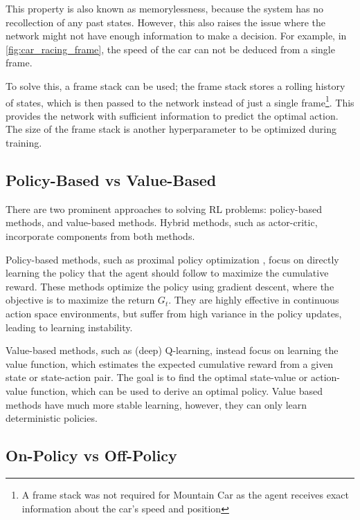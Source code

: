 This property is also known as memorylessness, because the system has no
recollection of any past states. However, this also raises the issue where the
network might not have enough information to make a decision. For example, in
\autoref{fig:car_racing_frame}, the speed of the car can not be deduced from a
single frame.



To solve this, a frame stack can be used; the frame stack stores a rolling
history of states, which is then passed to the network instead of just a single
frame\footnote{A frame stack was not required for Mountain Car as the agent
  receives exact information about the car's speed and position}. This provides
the network with sufficient information to predict the optimal action. The size
of the frame stack is another hyperparameter to be optimized during training.

\subsection{Policy-Based vs Value-Based}

There are two prominent approaches to solving RL problems: policy-based
methods, and value-based methods. Hybrid methods, such as actor-critic,
incorporate components from both methods.

Policy-based methods, such as proximal policy optimization
\cite{schulman2017proximal}, focus on directly learning the policy that the
agent should follow to maximize the cumulative reward. These methods optimize
the policy using gradient descent, where the objective is to maximize the
return $G_t$. They are highly effective in continuous action space
environments, but suffer from high variance in the policy updates, leading to
learning instability.

Value-based methods, such as (deep) Q-learning, instead focus on learning the
value function, which estimates the expected cumulative reward from a given
state or state-action pair. The goal is to find the optimal state-value or
action-value function, which can be used to derive an optimal policy. Value
based methods have much more stable learning, however, they can only learn
deterministic policies.

\subsection{On-Policy vs Off-Policy} \label{sec:on_vs_off_policy}

